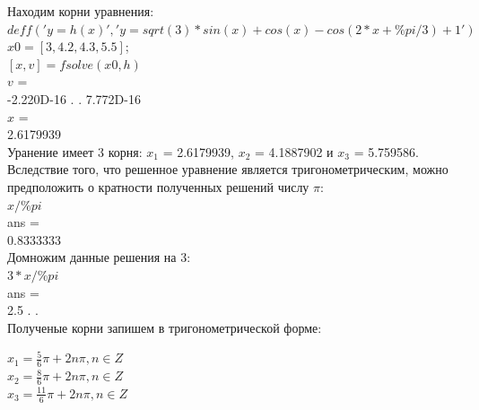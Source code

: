 \documentclass[russian, utf8, nocolumnxxxi, nocolumnxxxii, 14pt]{eskdtext}
\begin{document}
\indent Находим корни уравнения: \\
$deff('y=h(x)','y=sqrt(3)*sin(x)+cos(x)-cos(2*x+\%pi/3)+1')$ \\
$x0=[3,4.2,4.3,5.5]$; \\
$[x,v]=fsolve(x0,h)$ \\
 $v$  = \\
-2.220D-16 . . \quad 7.772D-16 \\
 $x$  = \\
   2.6179939    \\
\indent Уранение имеет 3 корня: $x_1$ = 2.6179939, $x_2$ = 4.1887902 и $x_3$ = 5.759586. 
\indent Вследствие того, что решенное уравнение является тригонометрическим, можно предположить о кратности полученных решений числу $\pi$:\\
$x/\%pi$\\
 ans  =\\
   0.8333333   \\
\indent Домножим данные решения на 3:\\
$3*x/\%pi$ \\
 ans  = \\
   2.5 . . \\
\indent Полученые корни запишем в тригонометрической форме:\\
\begin{center}
$x_1 = \frac{5}{6}\pi + 2n\pi, n \in Z$\\
$x_2 = \frac{8}{6}\pi + 2n\pi, n \in Z$\\
$x_3 = \frac{11}{6}\pi + 2n\pi, n \in Z$\\
\end{center}
\end{document}
